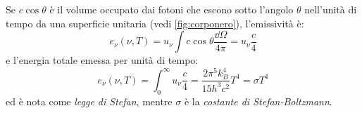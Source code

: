 Se $ c\cos \theta $ è il volume occupato dai fotoni che escono sotto l'angolo $ \theta $ nell'unità di tempo da una superficie unitaria (vedi \cref{fig:corponero}), l'emissività è:
\begin{equation*}
e_\nu (\nu,T) = u_\nu \int c \cos \theta \frac{\dd \Omega}{4\pi} = u_\nu \frac{c}{4}
\end{equation*}
e l'energia totale emessa per unità di tempo:
\begin{equation*}
e_\nu (\nu,T) = \int_{0}^{\infty} u_\nu \frac{c}{4} = \frac{2 \pi^5 k_B^4}{15h^3c^2}T^4 = \sigma T^4
\end{equation*}
ed è nota come \textit{legge di Stefan}, mentre $ \sigma $ è la \textit{costante di Stefan-Boltzmann}.